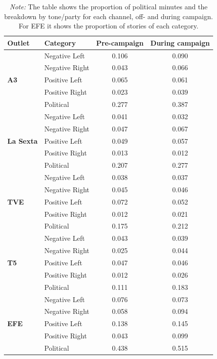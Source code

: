 \documentclass[12pt]{article}
\begin{document}
\begin{table}[!htbp]
\centering
\caption{Proportion of Political Content and Sentiment by Channel}
\begin{tabular}{llcc}
	\toprule
	\textbf{Outlet} & \textbf{Category} & \textbf{Pre-campaign} & \textbf{During campaign} \\
	\midrule
	\midrule
	\multirow{5}{*}{\textbf{A3}}& Negative Left & 0.106 & 0.090 \\
	& Negative Right & 0.043 & 0.066 \\
	& Positive Left & 0.065 & 0.061 \\
	& Positive Right & 0.023 & 0.039 \\
	& Political & 0.277 & 0.387 \\
	\midrule
	\multirow{5}{*}{\textbf{La Sexta}}& Negative Left & 0.041 & 0.032 \\
	& Negative Right & 0.047 & 0.067 \\
	& Positive Left & 0.049 & 0.057 \\
	& Positive Right & 0.013 & 0.012 \\
	& Political & 0.207 & 0.277 \\
	\midrule
	\multirow{5}{*}{\textbf{TVE}}& Negative Left & 0.038 & 0.037 \\
	& Negative Right & 0.045 & 0.046 \\
	& Positive Left & 0.072 & 0.052 \\
	& Positive Right & 0.012 & 0.021 \\
	& Political & 0.175 & 0.212 \\
	\midrule
	\multirow{5}{*}{\textbf{T5}}& Negative Left & 0.043 & 0.039 \\
	& Negative Right & 0.025 & 0.044 \\
	& Positive Left & 0.047 & 0.046 \\
	& Positive Right & 0.012 & 0.026 \\
	& Political & 0.111 & 0.183 \\
	\bottomrule
	\multirow{5}{*}{\textbf{ EFE}} & Negative Left & 0.076 & 0.073 \\
	& Negative Right & 0.058 & 0.094\\
	& Positive Left & 0.138 & 0.145 \\
	& Positive Right & 0.043 & 0.099\\
	& Political & 0.438 & 0.515 \\
	\bottomrule
	
\end{tabular}
\caption*{\small \textit{Note:} The table shows the proportion of political minutes and the breakdown by tone/party for each channel, off- and during campaign. For EFE it shows the proportion of stories of each category. }
\label{tab:political_sentiment_types}
\end{table}
\end{document}
